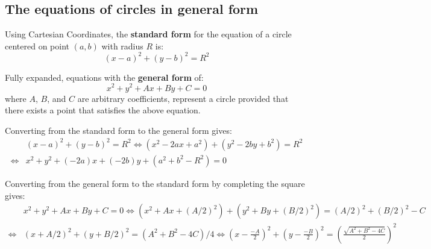 \documentclass{article}
\begin{document}
\subsection*{The equations of circles in general form}


Using Cartesian Coordinates, the {\bf standard form} for the equation of a circle centered on point \((a,b)\) with radius \(R\) is: 
\[(x-a)^2 + (y-b)^2 = R^2\] 

Fully expanded, equations with the {\bf general form} of: 
\[x^2 + y^2 + Ax + By + C = 0\]
where \(A\), \(B\), and \(C\) are arbitrary coefficients, represent a circle provided that there exists a point that satisfies the above equation. 

Converting from the standard form to the general form gives:
\begin{align*}
& (x-a)^2 + (y-b)^2 = R^2 
\iff (x^2 - 2ax + a^2) + (y^2 - 2by + b^2) = R^2 \\
\iff & x^2 + y^2 + (-2a)x + (-2b)y + (a^2 + b^2 - R^2) = 0
\end{align*}

Converting from the general form to the standard form by completing the square gives:
\begin{align*}
& x^2 + y^2 + Ax + By + C = 0 
\iff (x^2 + Ax + (A/2)^2) + (y^2 + By + (B/2)^2) = (A/2)^2 + (B/2)^2 - C \\
\iff & (x + A/2)^2 + (y + B/2)^2 = (A^2 + B^2 - 4C)/4 
\iff \left(x - \frac{-A}{2}\right)^2 + \left(y - \frac{-B}{2}\right)^2 = \left(\frac{\sqrt{A^2 + B^2 - 4C}}{2}\right)^2
\end{align*}
\end{document}
